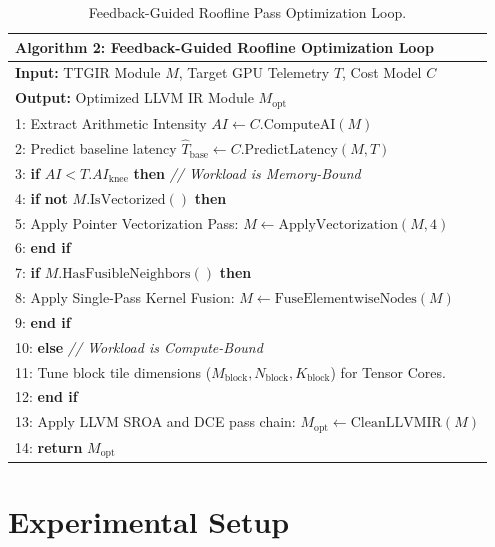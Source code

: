 \documentclass[10pt,journal,compsoc]{IEEEtran}
\begin{document}
\begin{table}[htbp]
\centering
\caption{Feedback-Guided Roofline Pass Optimization Loop.}
\label{alg:roofline_pass}
\small
\begin{tabular}{p{}}
\toprule
\textbf{Algorithm 2: Feedback-Guided Roofline Optimization Loop} \\
\midrule
\textbf{Input:} TTGIR Module $M$, Target GPU Telemetry $T$, Cost Model $C$ \\
\textbf{Output:} Optimized LLVM IR Module $M_{\text{opt}}$ \\
\midrule
1: Extract Arithmetic Intensity $AI \leftarrow C.\text{ComputeAI}(M)$\\
2: Predict baseline latency $\hat{T}_{\text{base}} \leftarrow C.\text{PredictLatency}(M, T)$\\
3: \textbf{if} $AI < T.AI_{\text{knee}}$ \textbf{then} \quad \textit{// Workload is Memory-Bound}\\
4: \quad \textbf{if} \textbf{not} $M.\text{IsVectorized}()$ \textbf{then}\\
5: \quad\quad Apply Pointer Vectorization Pass: $M \leftarrow \text{ApplyVectorization}(M, 4)$\\
6: \quad \textbf{end if}\\
7: \quad \textbf{if} $M.\text{HasFusibleNeighbors}()$ \textbf{then}\\
8: \quad\quad Apply Single-Pass Kernel Fusion: $M \leftarrow \text{FuseElementwiseNodes}(M)$\\
9: \quad \textbf{end if}\\
10: \textbf{else} \quad \textit{// Workload is Compute-Bound}\\
11: \quad Tune block tile dimensions ($M_{\text{block}}, N_{\text{block}}, K_{\text{block}}$) for Tensor Cores.\\
12: \textbf{end if}\\
13: Apply LLVM SROA and DCE pass chain: $M_{\text{opt}} \leftarrow \text{CleanLLVMIR}(M)$\\
14: \textbf{return} $M_{\text{opt}}$\\
\bottomrule
\end{tabular}
\end{table}

\section{Experimental Setup}\label{sec:setup}
\end{document}
